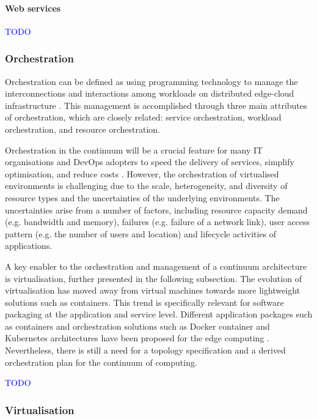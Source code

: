 \documentclass{ieeeaccess}
\begin{document}
\paragraph{Web services}

\textcolor{blue}{TODO}

\subsubsection{Orchestration}

Orchestration can be defined as using programming technology to manage the interconnections and interactions among workloads on distributed edge-cloud infrastructure \cite{cloud-to-thing}. This management is accomplished through three main attributes of orchestration, which are closely related: service orchestration, workload orchestration, and resource orchestration. 

Orchestration in the continuum will be a crucial feature for many IT organisations and DevOps adopters to speed the delivery of services, simplify optimisation, and reduce costs \cite{akamai}. However, the orchestration of virtualised environments is challenging due to the scale, heterogeneity, and diversity of resource types and the uncertainties of the underlying environments. The uncertainties arise from a number of factors, including resource capacity demand (e.g. bandwidth and memory), failures (e.g. failure of a network link), user access pattern (e.g. the number of users and location) and lifecycle activities of applications.

A key enabler to the orchestration and management of a continuum architecture is virtualisation, further presented in the following subsection. The evolution of virtualisation has moved away from virtual machines towards more lightweight solutions such as containers. This trend is specifically relevant for software packaging at the application and service level. Different application packages such as containers and orchestration solutions such as Docker container and Kubernetes architectures \cite{lxc-docker-k8s} have been proposed for the edge computing \cite{camera-virtualisation}. Nevertheless, there is still a need for a topology specification and a derived orchestration plan for the continuum of computing.

\textcolor{blue}{TODO}

\subsubsection{Virtualisation}
\label{sec:virtualisation}
\end{document}
